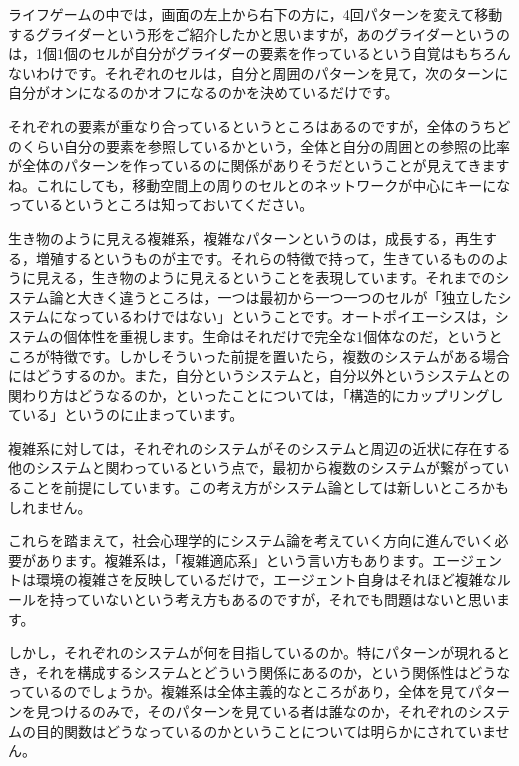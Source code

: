\documentclass{ltjsbook}
\begin{document}
ライフゲームの中では，画面の左上から右下の方に，4回パターンを変えて移動するグライダーという形をご紹介したかと思いますが，あのグライダーというのは，1個1個のセルが自分がグライダーの要素を作っているという自覚はもちろんないわけです。それぞれのセルは，自分と周囲のパターンを見て，次のターンに自分がオンになるのかオフになるのかを決めているだけです。

それぞれの要素が重なり合っているというところはあるのですが，全体のうちどのくらい自分の要素を参照しているかという，全体と自分の周囲との参照の比率が全体のパターンを作っているのに関係がありそうだということが見えてきますね。これにしても，移動空間上の周りのセルとのネットワークが中心にキーになっているというところは知っておいてください。

生き物のように見える複雑系，複雑なパターンというのは，成長する，再生する，増殖するというものが主です。それらの特徴で持って，生きているもののように見える，生き物のように見えるということを表現しています。それまでのシステム論と大きく違うところは，一つは最初から一つ一つのセルが「独立したシステムになっているわけではない」ということです。オートポイエーシスは，システムの個体性を重視します。生命はそれだけで完全な1個体なのだ，というところが特徴です。しかしそういった前提を置いたら，複数のシステムがある場合にはどうするのか。また，自分というシステムと，自分以外というシステムとの関わり方はどうなるのか，といったことについては，「構造的にカップリングしている」というのに止まっています。

複雑系に対しては，それぞれのシステムがそのシステムと周辺の近状に存在する他のシステムと関わっているという点で，最初から複数のシステムが繋がっていることを前提にしています。この考え方がシステム論としては新しいところかもしれません。

これらを踏まえて，社会心理学的にシステム論を考えていく方向に進んでいく必要があります。複雑系は，「複雑適応系」という言い方もあります。エージェントは環境の複雑さを反映しているだけで，エージェント自身はそれほど複雑なルールを持っていないという考え方もあるのですが，それでも問題はないと思います。

しかし，それぞれのシステムが何を目指しているのか。特にパターンが現れるとき，それを構成するシステムとどういう関係にあるのか，という関係性はどうなっているのでしょうか。複雑系は全体主義的なところがあり，全体を見てパターンを見つけるのみで，そのパターンを見ている者は誰なのか，それぞれのシステムの目的関数はどうなっているのかということについては明らかにされていません。
\end{document}
